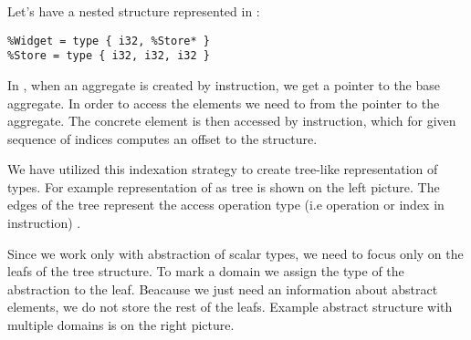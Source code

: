 \begin{example} \label{ex:fieldtrie}
Let's have a nested structure represented in \LLVMIR:
\begin{verbatim}
%Widget = type { i32, %Store* }
%Store = type { i32, i32, i32 }
\end{verbatim}
In \LLVM, when an aggregate is created by  instruction, we get
a pointer to the base aggregate. In order to access the elements we need to
 from the pointer to the aggregate. The concrete element is then
accessed by  instruction, which for given sequence of
indices computes an offset to the structure.

We have utilized this indexation strategy to create tree-like representation
of types. For example representation of  as tree is shown on the
left picture. The edges of the tree represent the access operation type
(i.e  operation or index in  instruction)
\cite{LLVM:langref}.

Since we work only with abstraction of scalar types, we need to focus only on
the leafs of the tree structure. To mark a domain we assign the type of the
abstraction to the leaf. Beacause we just need an information about abstract
elements, we do not store the rest of the leafs. Example abstract structure
with multiple domains is on the right picture.


\end{example}
